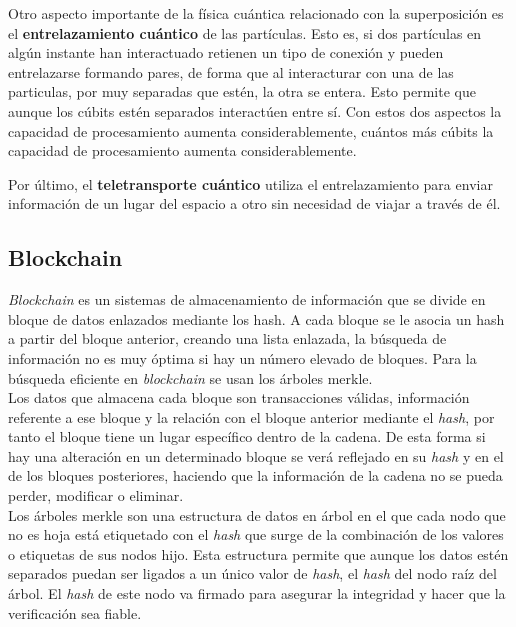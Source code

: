 Otro aspecto importante de la física cuántica relacionado con la superposición es el \textbf{entrelazamiento cuántico} de las partículas\cite{cumputacion-cuantica-clasica}. Esto es, si dos partículas en algún instante han interactuado retienen un tipo de conexión y pueden entrelazarse formando pares, de forma que al interacturar con una de las particulas, por muy separadas que estén, la otra se entera. Esto permite que aunque los cúbits estén separados interactúen entre sí. Con estos dos aspectos la capacidad de procesamiento aumenta considerablemente, cuántos más cúbits la capacidad de procesamiento aumenta considerablemente.

Por último, el \textbf{teletransporte cuántico} utiliza el entrelazamiento para enviar información de un lugar del espacio a otro sin necesidad de viajar a través de él.







\subsection{Blockchain}\label{sec:intro:blockchain}


\textit{Blockchain} es un sistemas de almacenamiento de información que se divide en bloque de datos enlazados mediante los hash. A cada bloque se le asocia un hash a partir del bloque anterior, creando una lista enlazada, la búsqueda de información no es muy óptima si hay un número elevado de bloques. Para la búsqueda eficiente en \textit{blockchain} se usan los árboles merkle.\\

Los datos que almacena cada bloque son transacciones válidas, información referente a ese bloque y la relación con el bloque anterior mediante el \textit{hash}, por tanto el bloque tiene un lugar específico dentro de la cadena. De esta forma si hay una alteración en un determinado bloque se verá reflejado en su \textit{hash} y en el de los bloques posteriores, haciendo que la información de la cadena no se pueda perder, modificar o eliminar.\\


Los árboles merkle \cite{arbol-merkle} son una estructura de datos en árbol en el que cada nodo que no es hoja está etiquetado con el \textit{hash} que surge de la combinación de los valores o etiquetas de sus nodos hijo. Esta estructura permite que aunque los datos estén separados puedan ser ligados a un único valor de \textit{hash}, el \textit{hash} del nodo raíz del árbol. El \textit{hash} de este nodo va firmado para asegurar la integridad y hacer que la verificación sea fiable. 

